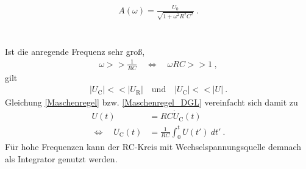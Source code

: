 \begin{align}
	A(\omega) = \frac{U_0}{\sqrt{1+\omega^2R^2C^2}} \ .
	\label{eq:amplitude}
\end{align}
\ \\
\ \\
Ist die anregende Frequenz sehr groß, 
\begin{align}
	\omega >> \frac{1}{RC} \quad\Leftrightarrow\quad \omega RC >> 1 \ ,
\end{align}
gilt
\begin{align}
	|U_\text{C}| << |U_\text{R}| \quad \text{und} \quad |U_\text{C}| << |U| \ .
\end{align}
Gleichung \eqref{Maschenregel} bzw. \eqref{Maschenregel_DGL} vereinfacht sich damit zu
\begin{align}
	U(t) &= RC\dot{U}_\text{C}(t) \\
	\Leftrightarrow\quad U_\text{C}(t) &= \frac{1}{RC}\int_0^t U(t')\ dt' \ .
\end{align}
Für hohe Frequenzen kann der RC-Kreis mit Wechselspannungsquelle demnach als Integrator genutzt werden.